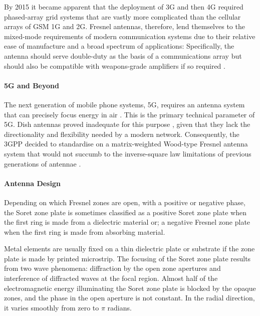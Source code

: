 \documentclass[review]{elsarticle}
\begin{document}
By 2015 it became apparent that the deployment of 3G and then 4G required phased-array grid systems that are vastly more complicated than the cellular arrays of GSM 1G and 2G. Fresnel antennas, therefore, lend themselves to the mixed-mode requirements of modern communication systems due to their relative ease of manufacture and a broad spectrum of applications: Specifically, the antenna should serve double-duty as the basis of a communications array but should also be compatible with weapons-grade amplifiers if so required \cite{ThompsonKuroda2015}. 

\paragraph{5G and Beyond} The next generation of mobile phone systems, 5G, requires an antenna system that can precisely focus energy in air \cite{Martinez2018}. This is the primary technical parameter of 5G. Dish antennas proved inadequate for this purpose \cite{ChenWang2020}, given that they lack the directionality and flexibility needed by a modern network. Consequently, the 3GPP decided to standardise on a matrix-weighted Wood-type Fresnel antenna system that would not succumb to the inverse-square law limitations of previous generations of antennae \cite{SinghPatel2019}.

\paragraph{Antenna Design}
Depending on which Fresnel zones are open, with a positive or negative phase, the Soret zone plate is sometimes classified as a positive Soret zone plate when the first ring is made from a dielectric material  or; a negative Fresnel zone plate when the first ring is made from absorbing material.

Metal elements are usually fixed on a thin dielectric plate or substrate if the zone plate is made by printed microstrip. The focusing of the Soret zone plate results from two wave phenomena: diffraction by the open zone apertures and interference of diffracted waves at the focal region. Almost half of the electromagnetic energy illuminating the Soret zone plate is blocked by the opaque zones, and the phase in the open aperture is not constant. In the radial direction, it varies smoothly from zero to $\pi$ radians.   
\end{document}
